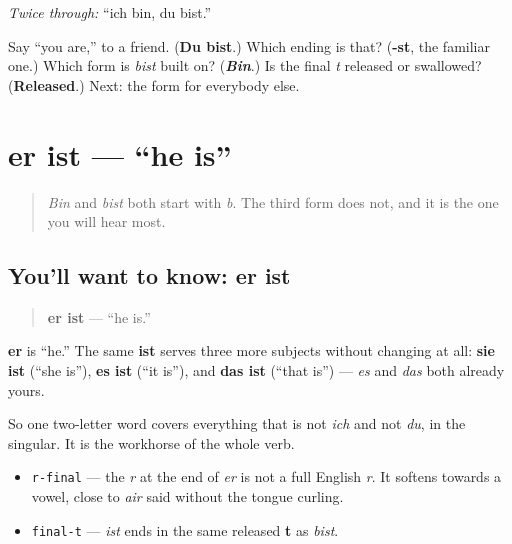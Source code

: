 \emph{Twice through:} \textquotedblleft{}ich bin, du bist.\textquotedblright{}

\begin{tcolorbox}[breakable,colback=teal!4,colframe=teal!35!black,title={Before you move on}]
Say \textquotedblleft{}you are,\textquotedblright{} to a friend. (\textbf{Du bist}.) Which ending is that? (\textbf{-st}, the familiar one.) Which form is \emph{bist} built on? (\emph{\textbf{Bin}}.) Is the final \emph{t} released or swallowed? (\textbf{Released}.) Next: the form for everybody else.
\end{tcolorbox}
\section[er ist]{er ist — \textquotedblleft{}he is\textquotedblright{}}

\label{lesson:GE-C16-er-ist}



\begin{quote}
\emph{Bin} and \emph{bist} both start with \emph{b}. The third form does not, and it is the one you will hear most.
\end{quote}

\subsection*{You'll want to know: er ist}
\begin{quote}
\textbf{er ist} — \textquotedblleft{}he is.\textquotedblright{}
\end{quote}

\textbf{er} is \textquotedblleft{}he.\textquotedblright{} The same \textbf{ist} serves three more subjects without changing at all: \textbf{sie ist} (\textquotedblleft{}she is\textquotedblright{}), \textbf{es ist} (\textquotedblleft{}it is\textquotedblright{}), and \textbf{das ist} (\textquotedblleft{}that is\textquotedblright{}) — \emph{es} and \emph{das} both already yours.

So one two-letter word covers everything that is not \emph{ich} and not \emph{du}, in the singular. It is the workhorse of the whole verb.

\begin{sounds}
\begin{itemize}
\raggedright
  \item \texttt{r-final} — the \emph{r} at the end of \emph{er} is not a full English \emph{r}. It softens towards a vowel, close to \emph{air} said without the tongue curling.
  \item \texttt{final-t} — \emph{ist} ends in the same released \textbf{t} as \emph{bist}.
\end{itemize}
\end{sounds}

